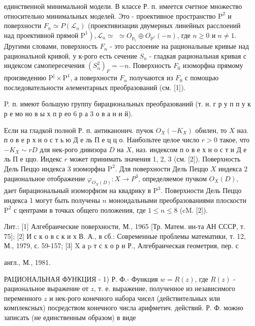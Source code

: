 \documentclass[10pt]{article}
\begin{document}
единственной минимальной модели. В классе Р. п. имеется счетное множество относительно минимальных моделей. Это - проективное пространство $\mathrm{P}^{2}$ и поверхности $F_{n} \simeq P\left(\mathscr{L}_{n}\right)$ (проективизации двумерных линейных расслоений над проективной прямой $\left.\mathrm{P}^{1}\right), \mathscr{L}_{n} \simeq$ $\simeq O_{\mathrm{p}_{1}} \oplus O_{\mathrm{p}^{1}}(-n)$, где $n \geqslant 0$ и $n \neq 1$. Другими словами, поверхность $F_{n}$ - это расслоение на рациональные кривые над рациональной кривой, у к-рого есть сечение $S_{n}$ - гладкая рациональная кривая с индексом самопересечения $\left(S_{n}^{2}\right)_{F}=-n$. Поверхность $F_{0}$ изоморфна прямому произведению $\mathrm{P}^{\mathrm{j}} \times \mathrm{P}^{1}$, а поверхности $F_{n}$ получаются из $F_{0}$ с помощью последовательности әлементарных преобразований (см. [1]).



P. п. имеют большую группу бирациональных преобразований (т. н. г р у п п у к р е мо но в ы х п р ео 6 р а 3 о в а н и й).



Если на гладкой полной Р. п. антиканонич. пучок $O_{X}\left(-K_{X}\right)$ обилен, то $X$ наз. п о в е р х н о с т ь ю Д е ль П е ц ц о. Наибольтее целое число $r>0$ такое, что $-K_{X} \sim r D$ для нек-рого дивизора $D$ на $X$, наз. индексом п о в е х н о с т и Д е ль П е ццо. Индекс $r$ может принимать значения 1, 2, 3 (см. [2]). Поверхность Дель Пеццо индекса 3 изоморфна $\mathrm{P}^{2}$. Для поверхности Дель Пеццо $X$ индекса 2 рациональное отображение $\varphi_{O_{X}(D)}: X \rightarrow P^{3}$, определяемое пучком $O_{X}(D)$, дает бирациональный изоморфизм на квадрику в $\mathrm{P}^{3}$. Поверхности Дель Пеццо индекса 1 могут быть получены $n$ моноидальными преобразованиями плоскости $\mathrm{P}^{2}$ с центрами в точках общего положения, где $1 \leqslant n \leqslant 8$ (cM. [2]).



Лит.: [1] Алгебраические поверхности, М., 1965 [Тр. Матем. ин-та АН СССР, т. 75]; [2] И с к о в с к и х В. А., в сб.: Современные проблемы математики, т. 12, М., 1979, с. 59-157; [3] X а p т с х о р н Р., Алгебраическая геометрия, пер. с

англ., М., 1981.



РАЦИОНАЛЬНАЯ ФУНКЦИЯ - 1) Р. Ф.- Функция $w=R(z)$, где $R(z)$ - рациональное выражение от $z$, т. е. выражение, полученное из независимого переменного $z$ и нек-рого конечного набора чисел (действительных или комплексных) посредством конечного числа арифметич. действий. Р. Ф. можно записать (не единственным образом) в виде
\end{document}
